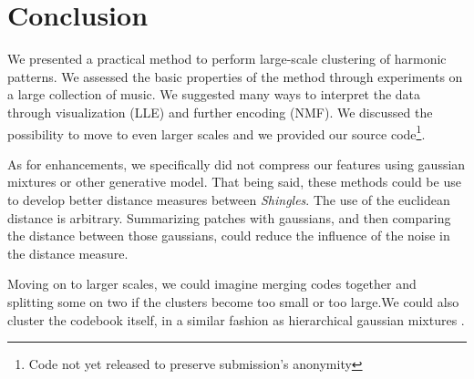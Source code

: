 \documentclass{article}
\begin{document}
\section{Conclusion}
We presented a practical method to perform large-scale clustering of
harmonic patterns. We assessed the basic properties of the method through
experiments on a large collection of music. We suggested many ways
to interpret the data through visualization (LLE) and further encoding
(NMF). We discussed the possibility to move to even larger scales
and we provided our source code\footnote{Code not yet released to preserve
submission's anonymity}.

As for enhancements, we specifically did not compress our features using
gaussian mixtures or other generative model. That being said, these methods
could be use to develop better distance measures between \textit{Shingles}.
The use of the euclidean distance is arbitrary. Summarizing patches
with gaussians, and then comparing the distance between those gaussians,
could reduce the influence of the noise in the distance measure.

Moving on to larger scales, we could imagine merging codes together and
splitting some on two if the clusters become too small or too large.We could
also cluster the codebook itself, in a similar fashion as hierarchical
gaussian mixtures \cite{Vasconcelos2001}.


\small



\end{document}
